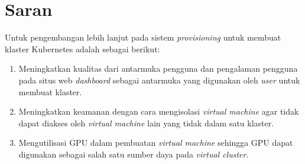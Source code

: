 \section{Saran}
\label{chap:saran}

Untuk pengembangan lebih lanjut pada sistem \emph{provisioning}
untuk membuat klaster Kubernetes adalah sebagai berikut:

\begin{enumerate}[nolistsep]

  \item Meningkatkan kualitas dari antarmuka pengguna dan pengalaman
    pengguna pada situs web \emph{dashboard} sebagai antarmuka
    yang digunakan oleh \emph{user} untuk membuat klaster.

  \item Meningkatkan keamanan dengan cara mengisolasi \emph{virtual machine}
    agar tidak dapat diakses oleh \emph{virtual machine} lain yang tidak
    dalam satu klaster.

  \item Mengutilisasi GPU dalam pembuatan \emph{virtual machine} sehingga
    GPU dapat digunakan sebagai salah satu sumber daya pada \emph{virtual cluster}.

\end{enumerate}
